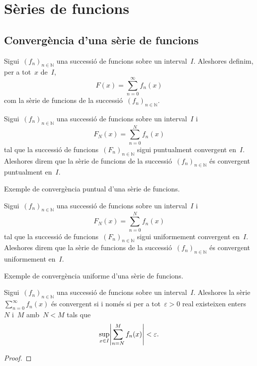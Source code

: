 \documentclass[../../main.tex]{subfiles}
\begin{document}
\section{Sèries de funcions}
	\subsection{Convergència d'una sèrie de funcions}
	\begin{definition}
		Sigui~\((f_{n})_{n\in\mathbb{N}}\) una successió de funcions sobre un interval~\(I\).
		Aleshores definim, per a tot~\(x\) de~\(I\),
		\[
		    F(x)=\sum_{n=0}^{\infty}f_{n}(x)
		\]
		com la sèrie de funcions de la successió~\((f_{n})_{n\in\mathbb{N}}\).
	\end{definition}
	\begin{definition}
		\label{def:convergència puntual d'una sèrie de funcions}
		Sigui~\((f_{n})_{n\in\mathbb{N}}\) una successió de funcions sobre un interval~\(I\) i
		\[
		    F_{N}(x)=\sum_{n=0}^{N}f_{n}(x)
		\]
		tal que la successió de funcions~\((F_{n})_{n\in\mathbb{N}}\) sigui puntualment convergent en~\(I\).
		Aleshores direm que la sèrie de funcions de la successió~\((f_{n})_{n\in\mathbb{N}}\) és convergent puntualment en~\(I\).
	\end{definition}
	\begin{example}
		Exemple de convergència puntual d'una sèrie de funcions.
		\begin{solution}
		\end{solution}
	\end{example}
	\begin{definition}
		\label{def:convergència uniforme d'una sèrie de funcions}
		Sigui~\((f_{n})_{n\in\mathbb{N}}\) una successió de funcions sobre un interval~\(I\) i
		\[
		    F_{N}(x)=\sum_{n=0}^{N}f_{n}(x)
		\]
		tal que la successió de funcions~\((F_{n})_{n\in\mathbb{N}}\) sigui uniformement convergent en~\(I\).
		Aleshores direm que la sèrie de funcions de la successió~\((f_{n})_{n\in\mathbb{N}}\) és convergent uniformement en~\(I\).
	\end{definition}
	\begin{example}
		Exemple de convergència uniforme d'una sèrie de funcions.
		\begin{solution}
		\end{solution}
	\end{example}
	\begin{theorem}
		\label{def:condició de Cauchy per sèries de funcions}
		Sigui~\((f_{n})_{n\in\mathbb{N}}\) una successió de funcions sobre un interval~\(I\).
		Aleshores la sèrie~\(\sum_{n=0}^{\infty}f_{n}(x)\) és convergent si i només si per a tot~\(\varepsilon>0\) real existeixen enters~\(N\) i~\(M\) amb~\(N<M\) tals que
		\[
		    \sup_{x\in I}\abs{\sum_{n=N}^{M}f_{n}(x)}<\varepsilon.
		\]
		\begin{proof}
		\end{proof}
	\end{theorem}
\end{document}
